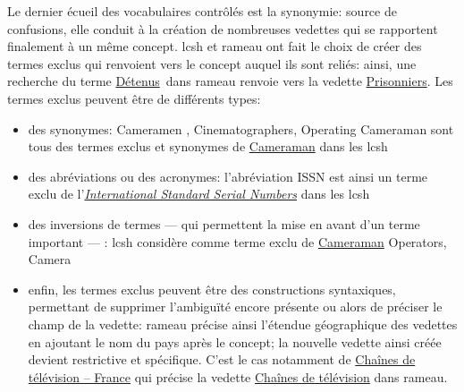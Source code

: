 Le dernier écueil des vocabulaires contrôlés est la synonymie: source de confusions, elle conduit à la création de nombreuses vedettes qui se rapportent finalement à un même concept. \ac{lcsh} et \ac{rameau} ont fait le choix de créer des termes exclus qui renvoient vers le concept auquel ils sont reliés: ainsi, une recherche du terme \og \href{https://data.bnf.fr/fr/search?term=detenus#Rameau}{Détenus}\fg ~dans \ac{rameau} renvoie vers la vedette \og\href{https://data.bnf.fr/fr/13318775/prisonniers/}{Prisonniers}\fg{}. Les termes exclus peuvent être de différents types:
\begin{itemize}
	\item des synonymes: \og Cameramen \fg{}, \og Cinematographers\fg{}, \og Operating Cameraman\fg{} sont tous des termes exclus et synonymes de \og\href{https://id.loc.gov/authorities/subjects/sh2002011142.html}{Cameraman}\fg{} dans les \ac{lcsh}
	\item des abréviations ou des acronymes: l'abréviation \og ISSN\fg{} est ainsi un terme exclu de l'\og\href{https://id.loc.gov/authorities/subjects/sh85067450.html}{\textit{International Standard Serial Numbers}}\fg{} dans les \ac{lcsh}
	\item des inversions de termes --- qui permettent la mise en avant d'un terme important --- : \ac{lcsh} considère comme terme exclu de \og\href{https://id.loc.gov/authorities/subjects/sh2002011142.html}{Cameraman}\fg{} \og Operators, Camera\fg{}
	\item enfin, les termes exclus peuvent être des constructions syntaxiques, permettant de supprimer l'ambiguïté encore présente ou alors de préciser le champ de la vedette: \ac{rameau} précise ainsi l'étendue géographique des vedettes en ajoutant le nom du pays après le concept; la nouvelle vedette ainsi créée devient restrictive et spécifique. C'est le cas notamment de \og\href{https://data.bnf.fr/fr/11979998/chaines_de_television_--_france/}{Chaînes de télévision -- France}\fg{} qui précise la vedette \og\href{https://data.bnf.fr/fr/11936935/chaines_de_television/}{Chaînes de télévision}\fg{} dans \ac{rameau}.
\end{itemize}
\bigskip
\bigskip

